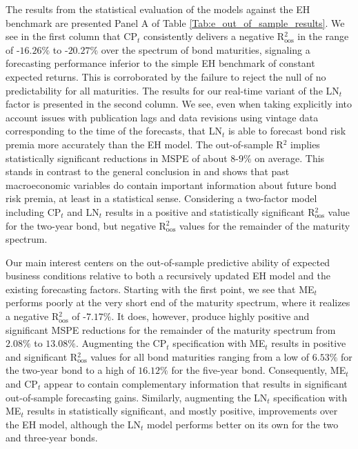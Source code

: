 \documentclass[12pt,letterpaper,leqno,doublespacing]{article}
\begin{document}
The results from the statistical evaluation of the models against the EH benchmark are presented Panel A of Table \ref{Tab:e_out_of_sample_results}. We see in the first column that CP$_{t}$ consistently delivers a negative R$^{2}_{\text{oos}}$ in the range of -$16.26\%$ to -$20.27\%$ over the spectrum of bond maturities, signaling a forecasting performance inferior to the simple EH benchmark of constant expected returns. This is corroborated by the failure to reject the null of no predictability for all maturities. The results for our real-time variant of the LN$_{t}$ factor is presented in the second column. We see, even when taking explicitly into account issues with publication lags and data revisions using vintage data corresponding to the time of the forecasts, that LN$_{t}$ is able to forecast bond risk premia more accurately than the EH model. The out-of-sample R$^{2}$ implies statistically significant reductions in MSPE of about $8$-$9\%$ on average. This stands in contrast to the general conclusion in \cite{GhyselsHoranMoench2014} and shows that past macroeconomic variables do contain important information about future bond risk premia, at least in a statistical sense. Considering a two-factor model including CP$_{t}$ and LN$_{t}$ results in a positive and statistically significant R$^{2}_{\text{oos}}$ value for the two-year bond, but negative R$^{2}_{\text{oos}}$ values for the remainder of the maturity spectrum. 

Our main interest centers on the out-of-sample predictive ability of expected business conditions relative to both a recursively updated EH model and the existing forecasting factors. Starting with the first point, we see that ME$_{t}$ performs poorly at the very short end of the maturity spectrum, where it realizes a negative R$^{2}_{\text{oos}}$ of -$7.17\%$. It does, however, produce highly positive and significant MSPE reductions for the remainder of the maturity spectrum from $2.08\%$ to $13.08\%$. Augmenting the CP$_{t}$ specification with ME$_{t}$ results in positive and significant R$^{2}_{\text{oos}}$ values for all bond maturities ranging from a low of $6.53\%$ for the two-year bond to a high of $16.12\%$ for the five-year bond. Consequently, ME$_{t}$ and CP$_{t}$ appear to contain complementary information that results in significant out-of-sample forecasting gains. Similarly, augmenting the LN$_{t}$ specification with ME$_{t}$ results in statistically significant, and mostly positive, improvements over the EH model, although the LN$_{t}$ model performs better on its own for the two and three-year bonds.
\end{document}
